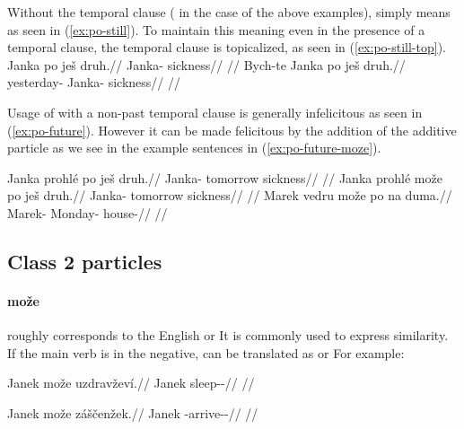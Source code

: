 Without the temporal clause ( in the case of the above examples),
 simply means  as seen in (\ref{ex:po-still}). To maintain
this meaning even in the presence of a temporal clause, the temporal clause is
topicalized, as seen in (\ref{ex:po-still-top}).
\pex
\a\label{ex:po-still}
\begingl
	\gla Janka po ješ druh.//
	\glb Janka-\Acc{} \Ipfv{} \Exst{} sickness//
	\glft {}//
\endgl
\a\label{ex:po-still-top}
\begingl
	\gla Bych-te Janka po ješ druh.//
	\glb yesterday-\Foc{} Janka-\Acc{} \Ipfv{} \Exst{} sickness//
	\glft {}//
\endgl
\xe

Usage of  with a non-past temporal clause is generally infelicitous as
seen in (\ref{ex:po-future}). However it can be made felicitous by the addition
of the additive particle  as we see in the example sentences in
(\ref{ex:po-future-moze}).

\pex\label{ex:po-future}
\begingl
	\gla \ljudge{\#}Janka prohlé po ješ druh.//
	\glb Janka-\Acc{} tomorrow \Ipfv{} \Exst{} sickness//
	\glft {}//
\endgl
\xe
\pex\label{ex:po-future-moze}
\a
\begingl
	\gla Janka prohlé može po ješ druh.//
	\glb Janka-\Acc{} tomorrow \Add{} \Ipfv{} \Exst{} sickness//
	\glft {}//
\endgl
\a
\begingl
	\gla Marek vedru može po na duma.//
	\glb Marek-\Acc{} Monday-\Ins{} \Add{} \Ipfv{} \Loc{} house-\Acc{}//
	\glft {}//
\endgl
\xe

\subsection{Class 2 particles}\label{sec:class2-particles}

\paragraph{može}  roughly corresponds to the English  or
 It is commonly used to express similarity. If the main verb is in
the negative,  can be translated as  or 
For example:

\pex
\begingl
	\gla Janek može uzdravževí.//
	\glb Janek \Add{} sleep-\Av{}-\Cont{}//
	\glft {}//
\endgl
\xe

\pex
\begingl
	\gla Janek može záščenžek.//
	\glb Janek \Add{} \Neg{}-arrive-\Av{}-\Pf{}//
	\glft {}//
\endgl
\xe

